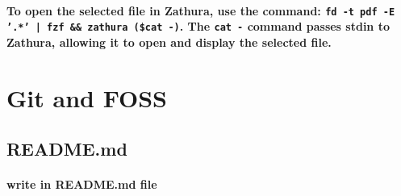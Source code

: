 \documentclass[11pt]{article}
\begin{document}
\paragraph{\small To open the selected file in Zathura, use the command: \texttt{fd -t pdf -E '.*' | fzf \&\& zathura (\$cat -)}. The \texttt{cat -} command passes stdin to Zathura, allowing it to open and display the selected file.}


\section{Git and FOSS}
\subsection{README.md}
\paragraph{write in README.md file}
\end{document}
